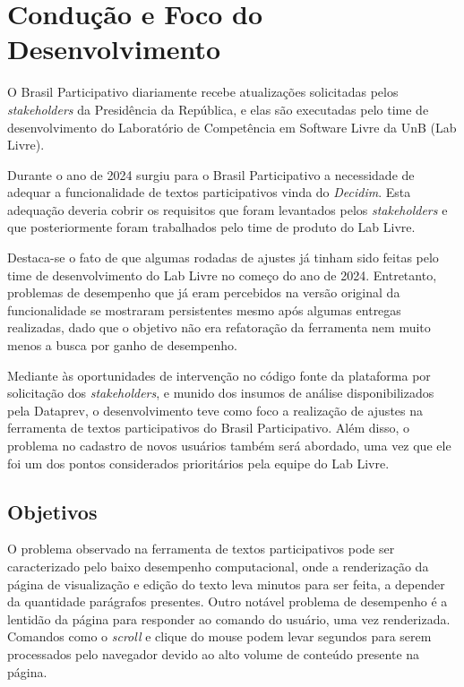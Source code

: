 \section {Condução e Foco do Desenvolvimento}
\label{sec:conducao-e-foco-do-desenvolvimento}

O Brasil Participativo diariamente recebe atualizações solicitadas pelos \textit{stakeholders} da Presidência da República, e elas são executadas pelo time de desenvolvimento do Laboratório de Competência em Software Livre da UnB (Lab Livre).

Durante o ano de 2024 surgiu para o Brasil Participativo a necessidade de adequar a funcionalidade de textos participativos vinda do \textit{Decidim}.
Esta adequação deveria cobrir os requisitos que foram levantados pelos \textit{stakeholders} e que posteriormente foram trabalhados pelo time de produto do Lab Livre.

Destaca-se o fato de que algumas rodadas de ajustes já tinham sido feitas pelo time de desenvolvimento do Lab Livre no começo do ano de 2024. Entretanto, problemas de desempenho que já eram percebidos na versão original da funcionalidade se mostraram persistentes mesmo após algumas entregas realizadas, dado que o objetivo não era refatoração da ferramenta nem muito menos a busca por ganho de desempenho.

Mediante às oportunidades de intervenção no código fonte da plataforma por solicitação dos \textit{stakeholders}, e munido dos insumos de análise disponibilizados pela Dataprev, o desenvolvimento teve como foco a realização de ajustes na ferramenta de textos participativos do Brasil Participativo. Além disso, o problema no cadastro de novos usuários também será abordado, uma vez que ele foi um dos pontos considerados prioritários pela equipe do Lab Livre.

\subsection {Objetivos}

O problema observado na ferramenta de textos participativos pode ser caracterizado pelo baixo desempenho computacional, onde a renderização da página de visualização e edição do texto leva minutos para ser feita, a depender da quantidade parágrafos presentes.
Outro notável problema de desempenho é a lentidão da página para responder ao comando do usuário, uma vez renderizada. Comandos como o \textit{scroll} e clique do mouse podem levar segundos para serem processados pelo navegador devido ao alto volume de conteúdo presente na página.

